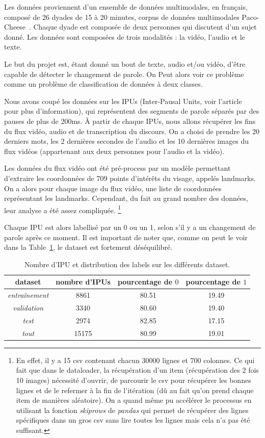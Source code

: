 Les données proviennent d'un ensemble de données multimodales, en français, composé de 26 dyades de 15 à 20 minutes, 
corpus de données multimodales Paco-Cheese~\cite{paperswithcode-paco}.
Chaque dyade est composée de deux personnes qui discutent d'un sujet donné. Les données sont composées de trois modalités : la vidéo,
l'audio et le texte.

Le but du projet est, étant donné un bout de texte, audio et/ou vidéo, d'être capable de détecter le changement de parole.
On Peut alors voir ce problème comme un problème de classification de données à deux classes.

Nous avons coupé les données sur les IPUs (Inter-Pausal Units, voir l'article~\cite{turn-taking} pour plus d'information),
qui représentent des segments de parole séparés par des pauses
de plus de 200ms. À partir de chaque IPUs, nous allons récupérer les fins du flux vidéo, audio et de transcription du discours.
On a choisi de prendre les 20 derniers mots, les 2 dernières secondes de l'audio et les 10 dernières images du flux vidéos
(appartenant aux deux personnes pour l'audio et la vidéo).

Les données du flux vidéo ont été pré-process par un modèle permettant d'extraire les coordonnées de 709 points d'intérêts du 
visage, appelés landmarks. On a alors pour chaque image du flux vidéo, une liste de coordonnées représentant les landmarks. Cependant, 
du fait au grand nombre des données, leur analyse a été assez compliquée.
\footnote{En effet, il y a 15 csv contenant chacun 30000 lignes et 700 colonnes. Ce qui fait que dans le dataloader, 
la récupération d'un item (récupération des 2 fois 10 images) nécessité d'ouvrir, de parcourir le csv pour récupérer les bonnes lignes et
de le refermer à la fin de l'itération (dû au fait qu'on prend chaque item de manières aléatoire). On a quand même pu accélérer le processus
en utilisant la fonction \textit{skiprows} de \textit{pandas} qui permet de récupérer des lignes spécifiques dans un gros csv sans lire 
toutes les lignes mais cela n'a pas été suffisant.}

Chaque IPU est alors labellisé par un 0 ou un 1, selon s'il y a un changement de parole après ce moment. Il est important de noter que, 
comme on peut le voir dans la Table~\ref{tab: label distribution}, le dataset est fortement déséquilibré.

\begin{table}
    \centering
    \begin{tabular}{|c|c|c|c|}
        \hline
        dataset & nombre d'IPUs & pourcentage de $0$ & pourcentage de $1$ \\
        \hline
        \textit{entraînement} & 8861 & 80.51 & 19.49\\
        \hline
        \textit{validation} & 3340 & 80.60 & 19.40\\
        \hline
        \textit{test} & 2974 & 82.85 & 17.15\\
        \hline
        \textit{tout} & 15175 & 80.99 & 19.01 \\
        \hline
    \end{tabular}
    \caption{Nombre d'IPU et distribution des labels sur les différents dataset.}
    \label{tab: label distribution}
\end{table}